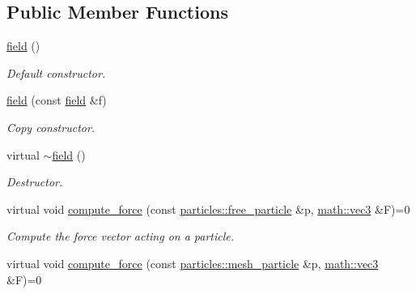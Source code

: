 \subsection*{Public Member Functions}
\begin{DoxyCompactItemize}
\item 
\mbox{\label{classphysim_1_1fields_1_1field_a2c4e1ea6c27e745695af1cb3fadf9fb6}} 
\hyperlink{classphysim_1_1fields_1_1field_a2c4e1ea6c27e745695af1cb3fadf9fb6}{field} ()
\begin{DoxyCompactList}\small\item\em Default constructor. \end{DoxyCompactList}\item 
\mbox{\label{classphysim_1_1fields_1_1field_ab355221b0b90b4612529c31190cf138f}} 
\hyperlink{classphysim_1_1fields_1_1field_ab355221b0b90b4612529c31190cf138f}{field} (const \hyperlink{classphysim_1_1fields_1_1field}{field} \&f)
\begin{DoxyCompactList}\small\item\em Copy constructor. \end{DoxyCompactList}\item 
\mbox{\label{classphysim_1_1fields_1_1field_a296551790d51e6366f3ee608b8505599}} 
virtual \hyperlink{classphysim_1_1fields_1_1field_a296551790d51e6366f3ee608b8505599}{$\sim$field} ()
\begin{DoxyCompactList}\small\item\em Destructor. \end{DoxyCompactList}\item 
virtual void \hyperlink{classphysim_1_1fields_1_1field_a0d836756ac51a6a1e99d3c9a60310694}{compute\+\_\+force} (const \hyperlink{classphysim_1_1particles_1_1free__particle}{particles\+::free\+\_\+particle} \&p, \hyperlink{structphysim_1_1math_1_1vec3}{math\+::vec3} \&F)=0
\begin{DoxyCompactList}\small\item\em Compute the force vector acting on a particle. \end{DoxyCompactList}\item 
virtual void \hyperlink{classphysim_1_1fields_1_1field_aa167d81f223daab47989168c9d3b8cb4}{compute\+\_\+force} (const \hyperlink{classphysim_1_1particles_1_1mesh__particle}{particles\+::mesh\+\_\+particle} \&p, \hyperlink{structphysim_1_1math_1_1vec3}{math\+::vec3} \&F)=0

\end{DoxyCompactItemize}
